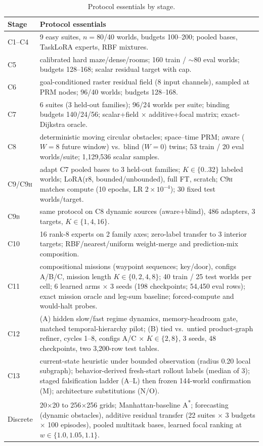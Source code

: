 \documentclass[letterpaper]{article} %
\newcommand{\stage}[1]{\textsc{#1}}
\begin{document}
\begin{table}[h]
\centering
\footnotesize
\begin{tabular}{@{}lp{5.6cm}@{}}
\toprule
Stage & Protocol essentials \\
\midrule
\stage{C1--C4} & 9 easy suites, $n{=}80$/40 worlds, budgets 100--200; pooled bases, TaskLoRA experts, RBF mixtures. \\
\stage{C5} & calibrated hard maze/dense/rooms; 160 train / $\sim$80 eval worlds; budgets 128--168; scalar residual target with cap. \\
\stage{C6} & goal-conditioned raster residual field (8 input channels), sampled at PRM nodes; 96/40 worlds; budgets 128--168. \\
\stage{C7} & 6 suites (3 held-out families); 96/24 worlds per suite; binding budgets 140/24/56; scalar+field $\times$ additive+focal matrix; exact-Dijkstra oracle. \\
\stage{C8} & deterministic moving circular obstacles; space--time PRM; aware ($W{=}8$ future window) vs.\ blind ($W{=}0$) twins; 53 train / 20 eval worlds/suite; 1{,}129{,}536 scalar samples. \\
\stage{C9/C9h} & adapt \stage{C7} pooled bases to 3 held-out families; $K\in\{0..32\}$ labeled worlds; LoRA(r8, bounded/unbounded), full FT, scratch; \stage{C9h} matches compute (10 epochs, LR $2{\times}10^{-4}$); 30 fixed test worlds/target. \\
\stage{C9b} & same protocol on \stage{C8} dynamic sources (aware+blind), 486 adapters, 3 targets, $K\in\{1,4,16\}$. \\
\stage{C10} & 16 rank-8 experts on 2 family axes; zero-label transfer to 3 interior targets; RBF/nearest/uniform weight-merge and prediction-mix composition. \\
\stage{C11} & compositional missions (waypoint sequences; key/door), configs A/B/C, mission length $K\in\{0,2,4,8\}$; 40 train / 25 test worlds per cell; 6 learned arms $\times$ 3 seeds (198 checkpoints; 54{,}450 eval rows); exact mission oracle and leg-sum baseline; forced-compute and would-halt probes. \\
\stage{C12} & (A) hidden slow/fast regime dynamics, memory-headroom gate, matched temporal-hierarchy pilot; (B) tied vs.\ untied product-graph refiner, cycles 1--8, configs A/C $\times$ $K\in\{2,8\}$, 3 seeds, 48 checkpoints, two 3{,}200-row test tables. \\
\stage{C13} & current-state heuristic under bounded observation (radius 0.20 local subgraph); behavior-derived fresh-start rollout labels (median of 3); staged falsification ladder (\stage{A}--\stage{L}) then frozen 144-world confirmation (\stage{M}); architecture substitutions (\stage{N}/\stage{O}). \\
Discrete & 20$\times$20 to 256$\times$256 grids; Manhattan-baseline A\textsuperscript{*}; forecasting (dynamic obstacles), additive residual transfer (22 suites $\times$ 3 budgets $\times$ 100 episodes), pooled multitask bases, learned focal ranking at $w\in\{1.0,1.05,1.1\}$. \\
\bottomrule
\end{tabular}
\caption{Protocol essentials by stage.}
\label{tab:protocols}
\end{table}
\end{document}
